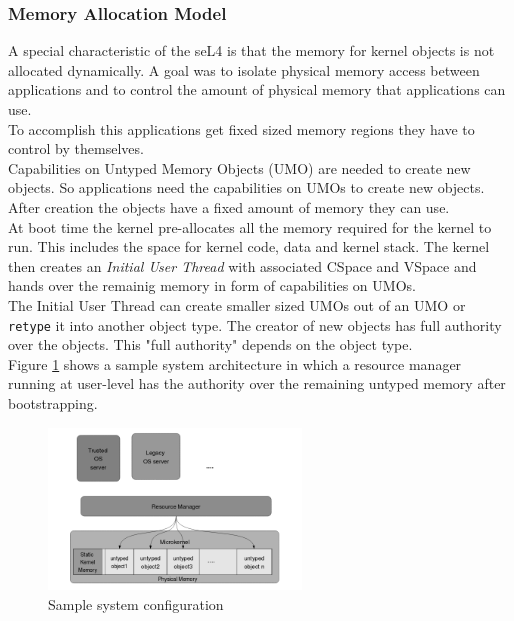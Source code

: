 \subsubsection{Memory Allocation Model} 
A special characteristic of the seL4 is that the memory for kernel objects is not allocated dynamically. A goal was to isolate physical memory access between applications and to control the amount of physical memory that applications can use. \\
To accomplish this applications get fixed sized memory regions they have to control by themselves. \\
Capabilities on Untyped Memory Objects (UMO) are needed to create new objects. So applications need the capabilities on UMOs to create new objects. After creation the objects have a fixed amount of memory they can use. \\
At boot time the kernel pre-allocates all the memory required for the kernel to run. This includes the space for kernel code, data and kernel stack. The kernel then creates an \textit{Initial User Thread} with associated CSpace and VSpace and hands over the remainig memory in form of capabilities on UMOs. \\
The Initial User Thread can create smaller sized UMOs out of an UMO or \texttt{retype} it into another object type. The creator of new objects has full authority over the objects. This "full authority" depends on the object type. \\
Figure \ref{fig:systarch} shows a sample system architecture in which a resource manager running at user-level  has the authority over the remaining untyped memory after bootstrapping. 
	
	\begin{figure}[ht]
	\centering
		\includegraphics[width=0.6\textwidth]{./Pictures/MemoryAllocation.png}
	\caption[Sample system architecture]{Sample system configuration \cite{TakeG}}
	\label{fig:systarch}
	\end{figure}	